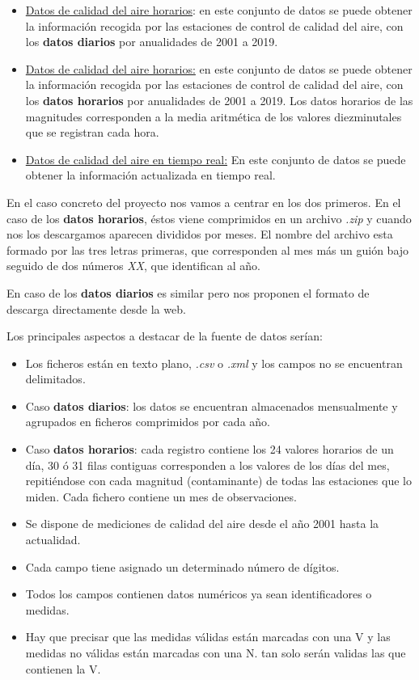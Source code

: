 \begin{itemize}
	\item \underline{Datos de calidad del aire horarios}: en este conjunto de datos se puede obtener la información recogida por las estaciones de control de calidad del aire, con los \textbf{datos diarios} por anualidades de 2001 a 2019. 
	\item \underline{Datos de calidad del aire horarios:} en este conjunto de datos se puede obtener la información recogida por las estaciones de control de calidad del aire, con los \textbf{datos horarios} por anualidades de 2001 a 2019. Los datos horarios de las magnitudes corresponden a la media aritmética de los valores diezminutales que se registran cada hora.
	\item \underline{Datos de calidad del aire en tiempo real:} En este conjunto de datos se puede obtener la información actualizada en tiempo real.
\end{itemize}

En el caso concreto del proyecto nos vamos a centrar en los dos primeros. En el caso de los \textbf{datos horarios}, éstos viene comprimidos en un archivo \textit{.zip} y cuando nos los descargamos aparecen divididos por meses. El nombre del archivo esta formado por las tres letras primeras, que corresponden al mes más un guión bajo seguido de dos números \textit{XX}, que identifican al año.

En caso de los \textbf{datos diarios} es similar pero nos proponen el formato de descarga directamente desde la web.

Los principales aspectos a destacar de la fuente de datos serían: 
\begin{itemize}
	\item Los ficheros están en texto plano, \textit{.csv} o \textit{.xml} y los campos no se encuentran delimitados.
	\item Caso\textbf{ datos diarios}: los datos se encuentran almacenados mensualmente y agrupados en ficheros comprimidos por cada año.
	\item Caso\textbf{ datos horarios}: cada registro contiene los 24 valores horarios de un día, 30 ó 31 filas contiguas corresponden a los valores de los días del mes, repitiéndose con cada magnitud (contaminante) de todas las estaciones que lo miden. Cada fichero contiene un mes de observaciones.
	\item Se dispone de mediciones de calidad del aire desde el año 2001 hasta la actualidad. 
	\item Cada campo tiene asignado un determinado número de dígitos. 
	\item Todos los campos contienen datos numéricos ya sean identificadores o medidas.
	\item Hay que precisar que las medidas válidas están marcadas con una V y las medidas no válidas están marcadas con una N. tan solo serán validas las que contienen la V.
\end{itemize}

